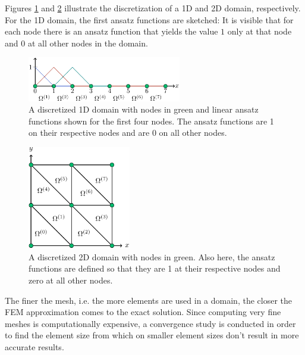\documentclass[%
  a4paper,oneside,%
  11pt,%
  smallchapters,
  style=printdev,
  extramargin,
  green,%
  rgb, <cmyk>
  ]{tubsbook}
\begin{document}
Figures \ref{fig:1DDom} and \ref{fig:2DDom} illustrate the discretization of a 1D and 2D domain, respectively.  For the 1D domain, the first ansatz functions are sketched: It is visible that for each node there is an ansatz function that yields the value $1$ only at that node and $0$ at all other nodes in the domain.
%
\begin{figure}[!ht]
\begin{center}

\includegraphics[width=0.6\textwidth]{pics/1dDomain}
\caption{A discretized 1D domain with nodes in green and linear ansatz functions shown for the first four nodes. The ansatz functions are 1 on their respective nodes and are 0 on all other nodes.}
\label{fig:1DDom}

\end{center}
\end{figure}
%
\begin{figure}[!ht]
\begin{center}

\includegraphics[width=0.4\textwidth]{pics/2dDomain}
\caption{A discretized 2D domain with nodes in green. Also here, the ansatz functions are defined so that they are 1 at their respective nodes and zero at all other nodes.}
\label{fig:2DDom}

\end{center}
\end{figure}
%
The finer the mesh, i.e. the more elements are used in a domain, the closer the FEM approximation comes to the exact solution. Since computing very fine meshes is computationally expensive, a convergence study is conducted in order to find the element size from which on smaller element sizes don't result in more accurate results.
\end{document}
